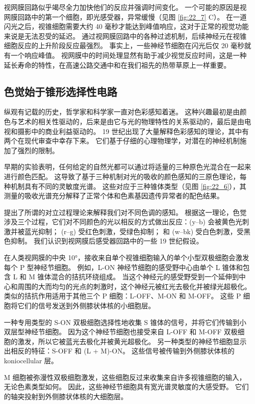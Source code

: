 视网膜回路似乎竭尽全力加快他们的反应并强调时间变化。 
一个可能的原因是视网膜回路中的第一个细胞，即光感受器，异常缓慢（见图 \ref{fig:22_7} C）。 
在一道闪光之后，视锥细胞需要大约 40 毫秒才能达到峰值响应，这对于正常的视觉功能来说是无法忍受的延迟。 
通过视网膜回路中的各种过滤机制，后续神经元在视锥细胞反应的上升阶段反应最强烈。 
事实上，一些神经节细胞在闪光后仅 20 毫秒就有一个响应峰值。 
视网膜中的时间处理显然有助于减少视觉反应时间，这是一种延长寿命的特性，在高速公路交通中和在我们祖先的热带草原上一样重要。


\subsection{色觉始于锥形选择性电路}
纵观有记载的历史，哲学家和科学家一直对色彩感知着迷。 
这种兴趣最初是由颜色与艺术的相关性驱动的，后来是由它与光的物理特性的关系驱动的，最后是由电视和摄影中的商业利益驱动的。 
19 世纪出现了大量解释色彩感知的理论，其中有两个在现代审查中幸存下来。 
它们基于仔细的心理物理学，对潜在的神经机制施加了强烈的限制。


早期的实验表明，任何给定的自然光都可以通过将适量的三种原色光混合在一起来进行颜色匹配。 
这导致了基于三种机制对光的吸收的颜色感知的三原色理论，每种机制具有不同的灵敏度光谱。 
这些对应于三种锥体类型（见图 \ref{fig:22_6}），其测量的吸收光谱充分解释了正常个体和色素基因遗传异常者的配色结果。


提出了所谓的对立过程理论来解释我们对不同色调的感知。 
根据这一理论，色觉涉及三个过程，它们对不同颜色的光以相反的方式做出反应：(y–b) 会被黄色光刺激并被蓝光抑制； (r–g) 受红色刺激，受绿色抑制； 和 (w–bk) 受白色刺激，受黑色抑制。 
我们认识到视网膜后感受器回路中的一些 19 世纪假设。


在人类视网膜的中央 10°，接收来自单个视锥细胞输入的单个小型双极细胞会激发每个 P 型神经节细胞。 
例如，L-ON 神经节细胞的感受野中心由单个 L 锥体和包含 L 和 M 锥体混合的拮抗环绕组成。 
当这个神经元的感受野受到一个延伸到中心和周围的大而均匀的光点的刺激时，这个神经元被红光去极化并被绿光超极化。 
类似的拮抗作用适用于其他三个 P 细胞：L-OFF、M-ON 和 M-OFF。 
这些 P 细胞将它们的信号发送到外侧膝状体核的小细胞层。


一种专用类型的 S-ON 双极细胞选择性地收集 S 锥体的信号，并将它们传输到小双层型神经节细胞。 
因为这个神经节细胞也接受来自 L-OFF 和 M-OFF 双极细胞的激发，所以它被蓝光去极化并被黄光超极化。 
另一种类型的神经节细胞显示出相反的特征：S-OFF 和 (L + M)-ON。 这些信号被传输到外侧膝状体核的 koniocellular 层。

M 细胞被弥漫性双极细胞激发，这些细胞反过来收集来自许多视锥细胞的输入，无论色素类型如何。 
因此，这些神经节细胞具有宽光谱灵敏度的大感受野。 
它们的轴突投射到外侧膝状体核的大细胞层。

